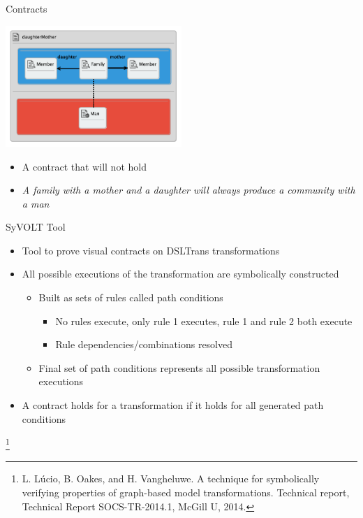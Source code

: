 \documentclass[xcolor=dvipsnames, 12pt, handout]{beamer}
\newcommand\blfootnote[1]{%
  \begingroup
  \renewcommand\thefootnote{}\footnote{#1}%
  \addtocounter{footnote}{-1}%
  \endgroup
}
\begin{document}
\begin{frame}{Contracts}
\begin{center}
\includegraphics[width=0.5\textwidth]{figures/daughterMotherProp}
\end{center}
\begin{itemize}[<+->]
\item A contract that will not hold
\item \textit{A family with a mother and a daughter will always produce a community with a man}
\end{itemize}
\end{frame}


\begin{frame}{SyVOLT Tool}
\begin{itemize}[<+->]
\item Tool to prove visual contracts on DSLTrans transformations
\item All possible executions of the transformation are symbolically constructed
\begin{itemize}[<+->]
\item Built as sets of rules called path conditions
\begin{itemize}
\item No rules execute, only rule 1 executes, rule 1 and rule 2 both execute
\item Rule dependencies/combinations resolved
\end{itemize}
\item Final set of path conditions represents all possible transformation executions
\end{itemize}
\item A contract holds for a transformation if it holds for all generated path conditions
\end{itemize}
\blfootnote{L. Lúcio, B. Oakes, and H. Vangheluwe. A technique for symbolically verifying properties of graph-based model transformations. Technical report, Technical Report SOCS-TR-2014.1, McGill U, 2014.}
\end{frame}
\end{document}
